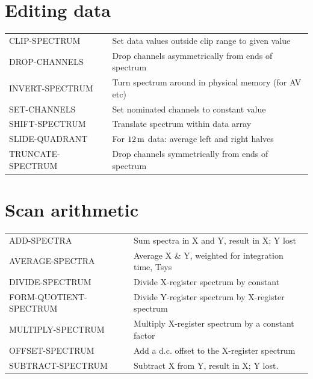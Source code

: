 \documentclass[11pt,twoside]{report}
\begin{document}
\section{Editing data} 

\begin{tabular}{ll}
CLIP-SPECTRUM            & Set data values outside clip range to given value\\
DROP-CHANNELS            & Drop channels asymmetrically from ends of spectrum\\
INVERT-SPECTRUM          & Turn spectrum around in physical memory (for AV etc)\\
SET-CHANNELS             & Set nominated channels to constant value\\
SHIFT-SPECTRUM           & Translate spectrum within data array\\
SLIDE-QUADRANT           & For $12{\rm\,m}$ data: average left and right halves\\
TRUNCATE-SPECTRUM        & Drop channels symmetrically from ends of spectrum\\
\end{tabular}

\section{Scan arithmetic} 

\begin{tabular}{ll}
ADD-SPECTRA              & Sum spectra in X and Y, result in X; Y lost\\
AVERAGE-SPECTRA          & Average X \& Y, weighted for integration time, Tsys\\
DIVIDE-SPECTRUM          & Divide X-register spectrum by constant\\
FORM-QUOTIENT-SPECTRUM   & Divide Y-register spectrum by X-register spectrum\\
MULTIPLY-SPECTRUM        & Multiply X-register spectrum by a constant factor\\
OFFSET-SPECTRUM          & Add a d.c. offset to the X-register spectrum\\
SUBTRACT-SPECTRUM         & Subtract X from Y, result in X; Y lost.\\
\end{tabular}
\end{document}
